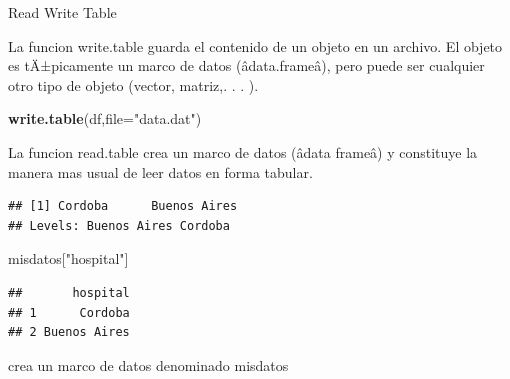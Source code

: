 \documentclass[ignorenonframetext,]{beamer}
\newenvironment{Shaded}{\begin{snugshade}}{\end{snugshade}}
\newcommand{\KeywordTok}[1]{\textcolor[rgb]{0.13,0.29,0.53}{\textbf{#1}}}
\newcommand{\DataTypeTok}[1]{\textcolor[rgb]{0.13,0.29,0.53}{#1}}
\newcommand{\StringTok}[1]{\textcolor[rgb]{0.31,0.60,0.02}{#1}}
\newcommand{\OperatorTok}[1]{\textcolor[rgb]{0.81,0.36,0.00}{\textbf{#1}}}
\newcommand{\NormalTok}[1]{#1}
\begin{document}
\begin{frame}[fragile]{Read Write Table}

La funcion write.table guarda el contenido de un objeto en un archivo.
El objeto es tÄ±picamente un marco de datos (âdata.frameâ), pero
puede ser cualquier otro tipo de objeto (vector, matriz,. . . ).

\begin{Shaded}
\begin{Highlighting}[]
\KeywordTok{write.table}\NormalTok{(df,}\DataTypeTok{file=}\StringTok{"data.dat"}\NormalTok{)  }
\end{Highlighting}
\end{Shaded}

La funcion read.table crea un marco de datos (âdata frameâ) y
constituye la manera mas usual de leer datos en forma tabular.

\begin{Shaded}
\end{Shaded}

\begin{verbatim}
## [1] Cordoba      Buenos Aires
## Levels: Buenos Aires Cordoba
\end{verbatim}

\begin{Shaded}
\begin{Highlighting}[]
\NormalTok{misdatos[}\StringTok{"hospital"}\NormalTok{]}
\end{Highlighting}
\end{Shaded}

\begin{verbatim}
##       hospital
## 1      Cordoba
## 2 Buenos Aires
\end{verbatim}

crea un marco de datos denominado misdatos

\end{frame}
\end{document}
